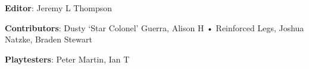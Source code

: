 \begin{description}

\item {\bfseries Editor}: Jeremy L Thompson

\item {\bfseries Contributors}: Dusty ‘Star Colonel’ Guerra, Alison H • Reinforced Legs, Joshua Natzke, Braden Stewart

\item {\bfseries Playtesters}: Peter Martin, Ian T

\end{description}
